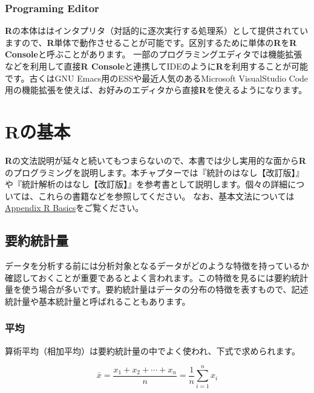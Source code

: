 \documentclass[
  12pt,
]{book}
\begin{document}
\hypertarget{programing-editor}{%
\subsection{Programing Editor}\label{programing-editor}}

\textbf{R}の本体ははインタプリタ（対話的に逐次実行する処理系）として提供されていますので、\textbf{R}単体で動作させることが可能です。区別するために単体の\textbf{R}を\textbf{R Console}と呼ぶことがあります。 一部のプログラミングエディタでは機能拡張などを利用して直接\textbf{R Console}と連携してIDEのように\textbf{R}を利用することが可能です。古くはGNU Emacs用のESSや最近人気のあるMicrosoft VisualStudio Code用の機能拡張を使えば、お好みのエディタから直接\textbf{R}を使えるようになります。

\hypertarget{rux306eux57faux672c}{%
\chapter{Rの基本}\label{rux306eux57faux672c}}

\textbf{R}の文法説明が延々と続いてもつまらないので、本書では少し実用的な面から\textbf{R}のプログラミングを説明します。本チャプターでは『統計のはなし【改訂版】』\citep{ToukeinoHanashi}や『統計解析のはなし【改訂版】』\citep{ToukeiKaisekinoHanashi}を参考書として説明します。個々の詳細については、これらの書籍などを参照してください。 なお、基本文法については\protect\hyperlink{Appendix-RBasics}{Appendix R Basics}をご覧ください。

\hypertarget{ux8981ux7d04ux7d71ux8a08ux91cf}{%
\section{要約統計量}\label{ux8981ux7d04ux7d71ux8a08ux91cf}}

データを分析する前には分析対象となるデータがどのような特徴を持っているか確認しておくことが重要であるとよく言われます。この特徴を見るには要約統計量を使う場合が多いです。要約統計量はデータの分布の特徴を表すもので、記述統計量や基本統計量と呼ばれることもあります。

\hypertarget{ux5e73ux5747}{%
\subsection{平均}\label{ux5e73ux5747}}

算術平均（相加平均）は要約統計量の中でよく使われ、下式で求められます。

\begin{equation}
  \bar{x} = \frac{x_1 + x_2 + \cdots + x_n}{n} = \frac{1}{n} \sum_{i = 1}^n x_i
\end{equation}
\end{document}
